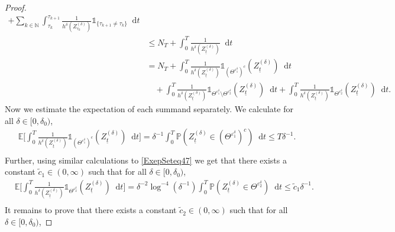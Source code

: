 \documentclass[11pt,a4paper]{article}
\numberwithin{equation}{section}
\theoremstyle{definition}
\newcommand{\E}{{\mathbb{E}}}
\newcommand{\N}{{\mathbb{N}}}
\renewcommand{\P}{{\mathbb{P}}}
\newcommand{\diff}{\mathop{}\!\mathrm{d}}
\begin{document}
\begin{proof}
\begin{equation}
\begin{aligned}
            + \sum_{k\in\N} \int_{\tau_k}^{\tau_{k+1}} \frac{1}{h^\delta(Z^{(\delta)}_{\tau_k})} \mathds{1}_{\{\tau_{k+1}\neq\tau_k\}} \diff t\\
            &\leq N_T + \int_0^T  \frac{1}{h^\delta(Z^{(\delta)}_{\underline t})}  \diff t\\
            &= N_T + \int_0^T  \frac{1}{h^\delta(Z^{(\delta)}_{\underline t})}  \mathds{1}_{(\Theta^{\varepsilon_1^\delta})^c}(Z^{(\delta)}_{\underline t}) \diff t  \\
            &\quad + \int_0^T  \frac{1}{h^\delta(Z^{(\delta)}_{\underline t})} \mathds{1}_{\Theta^{\varepsilon_1^\delta}\setminus\Theta^{\varepsilon_2^\delta} }(Z^{(\delta)}_{\underline t}) \diff t  
            + \int_0^T  \frac{1}{h^\delta(Z^{(\delta)}_{\underline t})}  \mathds{1}_{\Theta^{\varepsilon_2^\delta} }(Z^{(\delta)}_{\underline t}) \diff t.
        \end{aligned}
    \end{equation}
    Now we estimate the expectation of each summand separately. We calculate for all $\delta\in[0,\delta_0)$,
    \begin{equation}\label{eq:Cost2}
        \begin{aligned}
            &\E\Big[\int_0^T  \frac{1}{h^\delta(Z^{(\delta)}_{\underline t})}  \mathds{1}_{(\Theta^{\varepsilon_1^\delta})^c}(Z^{(\delta)}_{\underline t}) \diff t \Big] 
            = \delta^{-1} \int_0^T \P(Z^{(\delta)}_{\underline t} \in (\Theta^{\varepsilon_1^\delta})^c)\diff t \leq T \delta^{-1}. \\
        \end{aligned}
    \end{equation}    
    Further, using similar calculations to \eqref{ExepSeteq47} we get that there exists a constant $\widetilde c_1\in(0,\infty)$ such that for all $\delta\in[0,\delta_0)$,
    \begin{equation}\label{eq:Cost3}
        \begin{aligned}
            &\E\Big[\int_0^T  \frac{1}{h^\delta(Z^{(\delta)}_{\underline t})}  \mathds{1}_{\Theta^{\varepsilon_2^\delta} }(Z^{(\delta)}_{\underline t}) \diff t \Big]
            = \delta^{-2} \log^{-4}(\delta^{-1})\int_0^T \P(Z^{(\delta)}_{\underline t} \in \Theta^{\varepsilon_2^\delta})\diff t \leq \widetilde c_1 \delta^{-1}. \\
        \end{aligned}
    \end{equation} 
    It remains to prove that there exists a constant $\widetilde c_2\in(0,\infty)$ such that for all $\delta\in[0,\delta_0)$, 

\end{proof}
\end{document}

